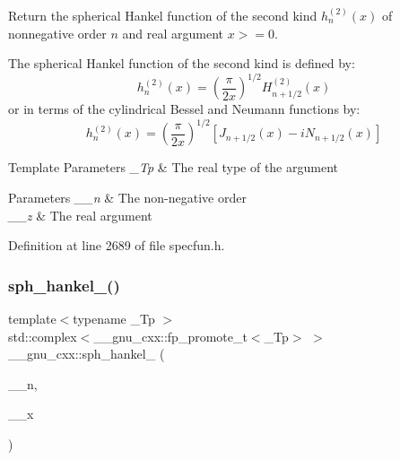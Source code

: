 Return the spherical Hankel function of the second kind $ h^{(2)}_n(x)$ of nonnegative order $ n $ and real argument $ x >= 0 $.

The spherical Hankel function of the second kind is defined by\+: \[ h^{(2)}_n(x) = \left(\frac{\pi}{2x} \right) ^{1/2} H^{(2)}_{n+1/2}(x) \] or in terms of the cylindrical Bessel and Neumann functions by\+: \[ h^{(2)}_n(x) = \left(\frac{\pi}{2x} \right) ^{1/2} \left[ J_{n+1/2}(x) - iN_{n+1/2}(x) \right] \]


\begin{DoxyTemplParams}{Template Parameters}
{\em \+\_\+\+Tp} & The real type of the argument \\
\hline
\end{DoxyTemplParams}

\begin{DoxyParams}{Parameters}
{\em \+\_\+\+\_\+n} & The non-\/negative order \\
\hline
{\em \+\_\+\+\_\+z} & The real argument \\
\hline
\end{DoxyParams}


Definition at line 2689 of file specfun.\+h.

\mbox{\label{group__gnu__math__spec__func_ga0e7d9b5a93ab1d1040040f0ef44590de}} 
\subsubsection{\texorpdfstring{sph\+\_\+hankel\+\_()}{sph\_hankel\_2()}\hspace{0.1cm}{\footnotesize\ttfamily [2/2]}}
{\footnotesize\ttfamily template$<$typename \+\_\+\+Tp $>$ \\
std\+::complex$<$\+\_\+\+\_\+gnu\+\_\+cxx\+::fp\+\_\+promote\+\_\+t$<$\+\_\+\+Tp$>$ $>$ \+\_\+\+\_\+gnu\+\_\+cxx\+::sph\+\_\+hankel\+\_ (\begin{DoxyParamCaption}\item[{unsigned int}]{\+\_\+\+\_\+n,  }\item[{std\+::complex$<$ \+\_\+\+Tp $>$}]{\+\_\+\+\_\+x }\end{DoxyParamCaption})\hspace{0.3cm}{\ttfamily [inline]}}

